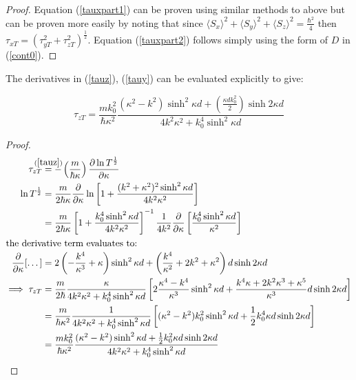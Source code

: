 \documentclass{article}
\begin{document}
\begin{proof} Equation (\ref{tauxpart1}) can be proven using similar methods to above but can be proven more easily by noting that since $\langle S_x \rangle^2 + \langle S_y \rangle^2 + \langle S_z \rangle^2 = \frac{\hbar^2}{4}$ then $\tau_{xT} = (\tau_{yT}^2+\tau_{zT}^2)^\frac{1}{2}$. Equation (\ref{tauxpart2}) follows simply using the form of $D$ in (\ref{cont0}).
\end{proof}

\noindent The derivatives in (\ref{tauz}), (\ref{tauy}) can be evaluated explicitly to give:

\begin{equation}
	\tau_{zT} = \frac{mk_0^2}{\hbar\kappa^2}\frac{(\kappa^2-k^2)\sinh^2{\kappa d}+\left(\frac{\kappa d k_0^2}{2}\right)\sinh{2\kappa d}}{4k^2\kappa^2+k_0^4\sinh^2{\kappa d}}
\end{equation}

\begin{proof}
\begin{subequations}
\begin{align}
	\tau_{zT} &\stackrel{\mathclap{(\ref{tauz})}}{=} -\left(\frac{m}{\hbar\kappa}\right)\frac{\partial \ln{T^{\frac{1}{2}}}}{\partial\kappa} \\
	\ln{T^{\frac{1}{2}}}&=\frac{m}{2\hbar\kappa}\frac{\partial}{\partial\kappa}\ln{\left[1+\frac{(k^2+\kappa^2)^2\sinh^2{\kappa d}}{4k^2\kappa^2}\right]} \\
			    &=\frac{m}{2\hbar\kappa}\left[1+\frac{k_0^4\sinh^2{\kappa d}}{4k^2\kappa^2}\right]^{-1}\frac{1}{4k^2}\frac{\partial}{\partial\kappa}\left[\frac{k_0^4\sinh^2{\kappa d}}{\kappa^2}\right]\\ \intertext{the derivative term evaluates to:}
	\frac{\partial}{\partial\kappa}[\dots]&=2\left(-\frac{k^4}{\kappa^3}+\kappa\right)\sinh^2{\kappa d}+\left(\frac{k^4}{\kappa^2}+2k^2+\kappa^2\right)d\sinh{2\kappa d} \\
	\implies \tau_{zT} &= \frac{m}{2\hbar} \frac{\kappa}{4k^2\kappa^2+k_0^4\sinh^2{\kappa d}}\left[2\frac{\kappa^4-k^4}{\kappa^3}\sinh^2{\kappa d}+\frac{k^4\kappa+2k^2\kappa^3+\kappa^5}{\kappa^3}d\sinh{2\kappa d}\right] \\
			&= \frac{m}{\hbar\kappa^2} \frac{1}{4k^2\kappa^2+k_0^4\sinh^2{\kappa d}}\left[(\kappa^2-k^2)k_0^2\sinh^2{\kappa d}+\frac{1}{2}k_0^4\kappa d\sinh{2\kappa d}\right] \\
			&= \frac{mk_0^2}{\hbar\kappa^2}\frac{(\kappa^2-k^2)\sinh^2{\kappa d}+\frac{1}{2}k_0^2\kappa d\sinh{2\kappa d}}{4k^2\kappa^2+k_0^4\sinh^2{\kappa d}}
\end{align}
\end{subequations}
\end{proof}
\end{document}
